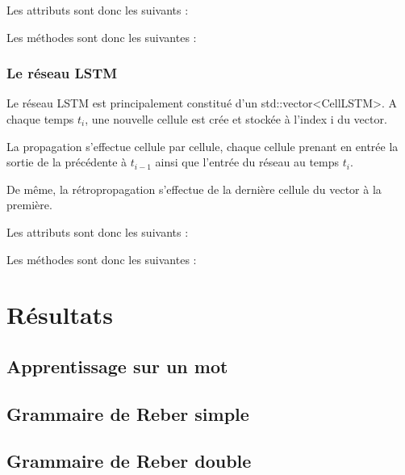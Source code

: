 \bigskip

Les attributs sont donc les suivants :


Les méthodes sont donc les suivantes :


\subsubsection{Le réseau LSTM}

Le réseau LSTM est principalement constitué d'un std::vector<CellLSTM>.
A chaque temps $t_i$, une nouvelle cellule est crée et stockée à l'index i du
vector.

\medskip

La propagation s'effectue cellule par cellule, chaque cellule prenant en entrée
la sortie de la précédente à $t_{i-1}$ ainsi que l'entrée du réseau au temps
$t_i$.

\medskip

De même, la rétropropagation s'effectue de la dernière cellule du vector à
la première.

\bigskip

Les attributs sont donc les suivants :


\bigskip

Les méthodes sont donc les suivantes :


\section{Résultats}
\subsection{Apprentissage sur un mot}
\subsection{Grammaire de Reber simple}
\subsection{Grammaire de Reber double}
